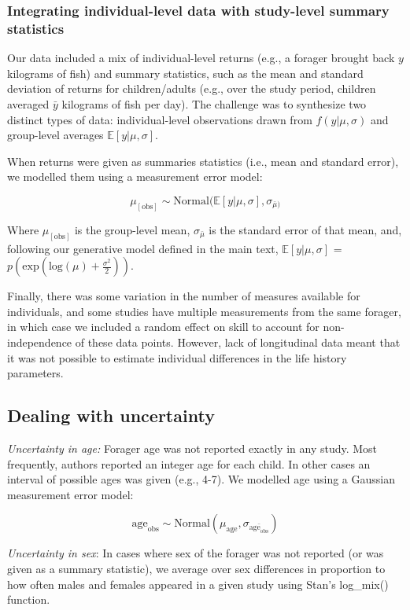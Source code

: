 \subsubsection{Integrating individual-level data with study-level summary statistics}

Our data included a mix of individual-level returns (e.g., a forager brought back $y$ kilograms of fish) and summary statistics, such as the mean and standard deviation of returns for children/adults (e.g., over the study period, children averaged $\bar{y}$ kilograms of fish per day). The challenge was to synthesize two distinct types of data: individual-level observations drawn from $f(y|\mu,\sigma)$ and group-level averages $\mathbb{E}[y|\mu,\sigma]$.

When returns were given as summaries statistics (i.e., mean and standard error), we modelled them using a measurement error model:

$$ \mu_{[\textrm{obs}]} \sim \textrm{Normal}(\mathbb{E}[y|\mu,\sigma], \sigma_{\bar{\mu})} $$

Where $\mu_{[\textrm{obs}]}$ is the group-level mean, $\sigma_{\bar{\mu}}$ is the standard error of that mean, and, following our generative model defined in the main text, $\mathbb{E}[y|\mu,\sigma]$ = $p(\textrm{exp}( \textrm{log}(\mu) + \frac{\sigma^2}{2})) $.

Finally, there was some variation in the number of measures available for individuals, and some studies have multiple measurements from the same forager, in which case we included a random effect on skill to account for non-independence of these data points. However, lack of longitudinal data meant that it was not possible to estimate individual differences in the life history parameters.


\subsection{Dealing with uncertainty }

\emph{Uncertainty in age:} Forager age was not reported exactly in any study. Most frequently, authors reported an integer age for each child. In other cases an interval of possible ages was given (e.g., 4-7). We modelled age using a Gaussian measurement error model:

$$ \textrm{age}_{\textrm{obs}} \sim \textrm{Normal}(\mu_{\textrm{age}}, \sigma_{\bar{\textrm{age}_{\textrm{obs}}}}) $$

\emph{Uncertainty in sex}: In cases where sex of the forager was not reported (or was given as a summary statistic), we average over sex differences in proportion to how often males and females appeared in a given study using Stan's log\_mix() function.

